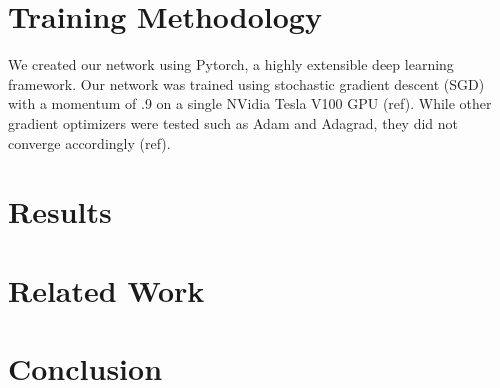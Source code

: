 \documentclass[12pt,conference]{ieeeconf}
\begin{document}
\section{Training Methodology}
We created our network using Pytorch, a highly extensible deep learning framework. Our network was trained using stochastic gradient descent (SGD) with a momentum of .9 on a single NVidia Tesla V100 GPU (ref). While other gradient optimizers were tested such as Adam and Adagrad, they did not converge accordingly (ref). 

\section{Results}

\section{Related Work}

\section{Conclusion}


\end{document}
